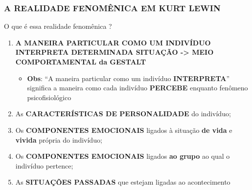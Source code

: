 \documentclass[
]{book}
\providecommand{\tightlist}{%
  \setlength{\itemsep}{0pt}\setlength{\parskip}{0pt}}
\begin{document}
\hypertarget{a-realidade-fenomuxeanica-em-kurt-lewin}{%
\subsubsection{A REALIDADE FENOMÊNICA EM KURT
LEWIN}\label{a-realidade-fenomuxeanica-em-kurt-lewin}}

O que é essa realidade fenomênica ?

\begin{enumerate}
\def\labelenumi{\arabic{enumi}.}
\tightlist
\item
  \textbf{A MANEIRA PARTICULAR COMO UM INDIVÍDUO INTERPRETA DETERMINADA
  SITUAÇÃO -\textgreater{} MEIO COMPORTAMENTAL da GESTALT}

  \begin{itemize}
  \tightlist
  \item
    \textbf{Obs}: ``A maneira particular como um indivíduo
    \textbf{INTERPRETA}'' significa a maneira como cada indivíduo
    \textbf{PERCEBE} enquanto fenômeno psicofisiológico
  \end{itemize}
\item
  As \textbf{CARACTERÍSTICAS DE PERSONALIDADE} do indivíduo;
\item
  Os \textbf{COMPONENTES EMOCIONAIS} ligados à situação \textbf{de vida}
  e \textbf{vivida} própria do indivíduo;
\item
  Os \textbf{COMPONENTES EMOCIONAIS} ligados \textbf{ao grupo} ao qual o
  indivíduo pertence;
\item
  As \textbf{SITUAÇÕES PASSADAS} que estejam ligadas ao acontecimento
\end{enumerate}
\end{document}

